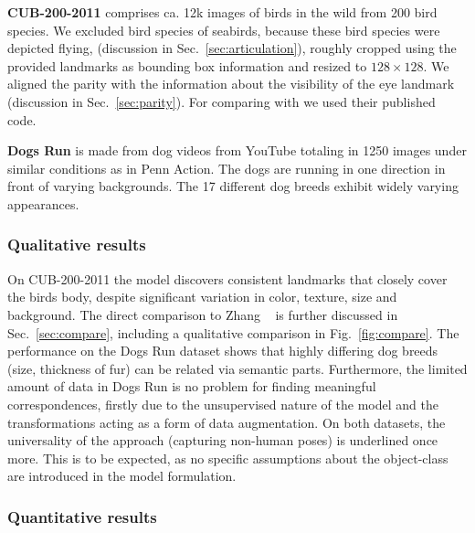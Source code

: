 
		\begin{tcolorbox}
			\textbf{CUB-200-2011} \cite{wah11birds} comprises ca. 12k images of birds in the wild from 200 bird species.
			We excluded bird species of seabirds, because these bird species were depicted flying, (discussion in Sec.~\ref{sec:articulation}), roughly cropped using the provided landmarks as bounding box information and resized to $128\times128$.
			We aligned the parity with the information about the visibility of the eye landmark (discussion in Sec.~\ref{sec:parity}).
			For comparing with \cite{zhang18} we used their published code.
		\end{tcolorbox}
		\begin{tcolorbox}
			\textbf{Dogs Run} is made from dog videos from YouTube totaling in 1250 images under similar conditions as in Penn Action. The dogs are running in one direction in front of varying backgrounds. The 17 different dog breeds exhibit widely varying appearances.
		\end{tcolorbox}

		\subsubsection{Qualitative results}
			On CUB-200-2011 the model discovers consistent landmarks that closely cover the birds body, despite significant variation in color, texture, size and background. The direct comparison to Zhang \etal~\cite{zhang18} is further discussed in Sec.~\ref{sec:compare}, including a qualitative comparison in Fig.~\ref{fig:compare}.
			The performance on the Dogs Run dataset shows that highly differing dog breeds (size, thickness of fur) can be related via semantic parts.
			Furthermore, the limited amount of data in Dogs Run is no problem for finding meaningful correspondences, firstly due to the unsupervised nature of the model and the transformations acting as a form of data augmentation.
			On both datasets, the universality of the approach (capturing non-human poses) is underlined once more.
			This is to be expected, as no specific assumptions about the object-class are introduced in the model formulation.


		\subsubsection{Quantitative results}

